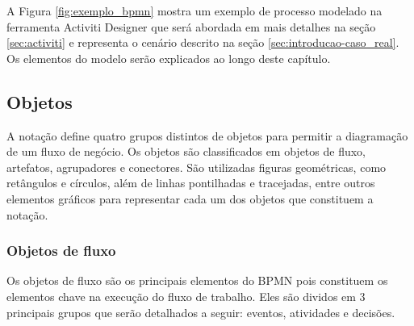 A Figura \ref{fig:exemplo_bpmn} mostra um exemplo de processo modelado na ferramenta Activiti Designer que será abordada em mais detalhes na seção \ref{sec:activiti} e representa o cenário descrito na seção \ref{sec:introducao-caso_real}. Os elementos do modelo serão explicados ao longo deste capítulo.


\subsection{Objetos}\label{sec:bpm-bpmn_objetos}

A notação define quatro grupos distintos de objetos para permitir a diagramação de um fluxo de negócio. Os objetos são classificados em objetos de fluxo, artefatos, agrupadores e conectores. São utilizadas figuras geométricas, como retângulos e círculos, além de linhas pontilhadas e tracejadas, entre outros elementos gráficos para representar cada um dos objetos que constituem a notação.

\subsubsection{Objetos de fluxo}\label{sec:bpm-bpmn_objetos_fluxo}

Os objetos de fluxo são os principais elementos do BPMN pois constituem os elementos chave na execução do fluxo de trabalho. Eles são dividos em 3 principais grupos que serão detalhados a seguir: eventos, atividades e decisões.


